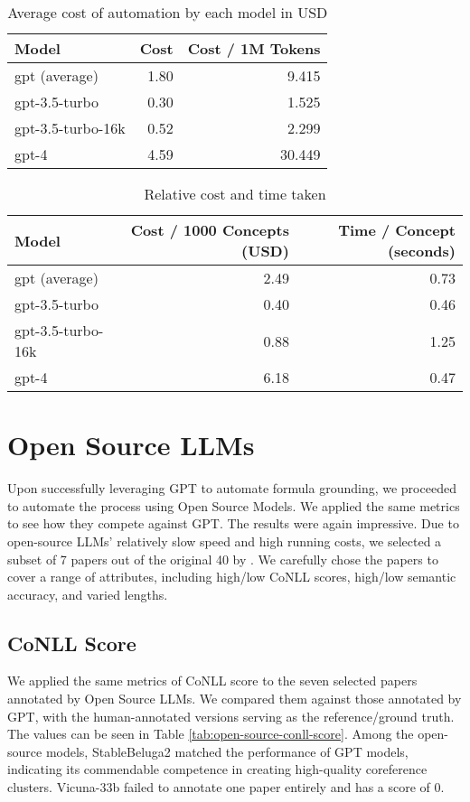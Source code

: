 \begin{table}[htpb]
  \centering
  \begin{tabular}{lrr}
    \hline
    Model & Cost & Cost / 1M Tokens \\
    \hline
    gpt (average) & 1.80 & 9.415 \\
    gpt-3.5-turbo & 0.30 & 1.525 \\
    gpt-3.5-turbo-16k & 0.52 & 2.299 \\
    gpt-4 & 4.59 & 30.449 \\
    \hline
  \end{tabular}
  \caption[Cost Analysis]{Average cost of automation by each model in USD}
  \label{tab:cost}
\end{table}

\begin{table}[htpb]
  \centering
  \begin{tabular}{lrr}
    \hline
    Model & Cost / 1000 Concepts (USD) & Time / Concept (seconds) \\
    \hline
    gpt (average) & 2.49 & 0.73\\
    gpt-3.5-turbo & 0.40 & 0.46 \\
    gpt-3.5-turbo-16k & 0.88 & 1.25 \\
    gpt-4 & 6.18 & 0.47 \\
    \hline
  \end{tabular}
  \caption[Cost Analysis]{Relative cost and time taken}
  \label{tab:relative-cost}
\end{table}


\section{Open Source LLMs}
Upon successfully leveraging GPT to automate formula grounding, we proceeded to automate the process using Open Source Models. We applied the same metrics to see how they compete against GPT. The results were again impressive. Due to open-source LLMs' relatively slow speed and high running costs, we selected a subset of 7 papers out of the original 40 by \citet{asakura2022building}. We carefully chose the papers to cover a range of attributes, including high/low CoNLL scores, high/low semantic accuracy, and varied lengths.

\subsection{CoNLL Score}
We applied the same metrics of CoNLL score to the seven selected papers annotated by Open Source LLMs. We compared them against those annotated by GPT, with the human-annotated versions serving as the reference/ground truth. The values can be seen in Table \ref{tab:open-source-conll-score}. Among the open-source models, StableBeluga2 matched the performance of GPT models, indicating its commendable competence in creating high-quality coreference clusters. Vicuna-33b failed to annotate one paper entirely and has a score of 0.

